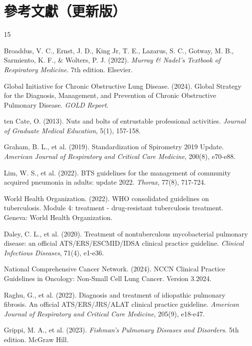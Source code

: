 \documentclass[12pt,a4paper]{article}
\begin{document}
\section{參考文獻（更新版）}
\begin{thebibliography}{15}

Broaddus, V. C., Ernst, J. D., King Jr, T. E., Lazarus, S. C., Gotway, M. B., Sarmiento, K. F., \& Wolters, P. J. (2022). \textit{Murray \& Nadel's Textbook of Respiratory Medicine}. 7th edition. Elsevier.

Global Initiative for Chronic Obstructive Lung Disease. (2024). Global Strategy for the Diagnosis, Management, and Prevention of Chronic Obstructive Pulmonary Disease. \textit{GOLD Report}.

ten Cate, O. (2013). Nuts and bolts of entrustable professional activities. \textit{Journal of Graduate Medical Education}, 5(1), 157-158.

Graham, B. L., et al. (2019). Standardization of Spirometry 2019 Update. \textit{American Journal of Respiratory and Critical Care Medicine}, 200(8), e70-e88.

Lim, W. S., et al. (2022). BTS guidelines for the management of community acquired pneumonia in adults: update 2022. \textit{Thorax}, 77(8), 717-724.

World Health Organization. (2022). WHO consolidated guidelines on tuberculosis. Module 4: treatment - drug-resistant tuberculosis treatment. Geneva: World Health Organization.

Daley, C. L., et al. (2020). Treatment of nontuberculous mycobacterial pulmonary disease: an official ATS/ERS/ESCMID/IDSA clinical practice guideline. \textit{Clinical Infectious Diseases}, 71(4), e1-e36.

National Comprehensive Cancer Network. (2024). NCCN Clinical Practice Guidelines in Oncology: Non-Small Cell Lung Cancer. Version 3.2024.

Raghu, G., et al. (2022). Diagnosis and treatment of idiopathic pulmonary fibrosis. An official ATS/ERS/JRS/ALAT clinical practice guideline. \textit{American Journal of Respiratory and Critical Care Medicine}, 205(9), e18-e47.

Grippi, M. A., et al. (2023). \textit{Fishman's Pulmonary Diseases and Disorders}. 5th edition. McGraw Hill.

\end{thebibliography}
\end{document}
